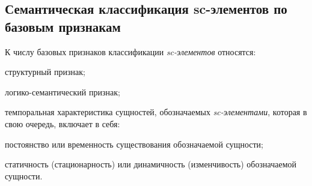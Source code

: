 \newpage
\subsection{Семантическая классификация sc-элементов по базовым признакам}
К числу базовых признаков классификации \textit{sc-элементов} относятся:

\begin{textitemize}
	\item структурный признак;
	\item логико-семантический признак;
	\item темпоральная характеристика сущностей, обозначаемых \textit{sc-элементами}, которая в свою очередь, включает в себя:
	\begin{textitemize}
		\item постоянство или временность существования обозначаемой сущности;
		\item статичность (стационарность) или динамичность (изменчивость) обозначаемой сущности.
	\end{textitemize}
\end{textitemize}

